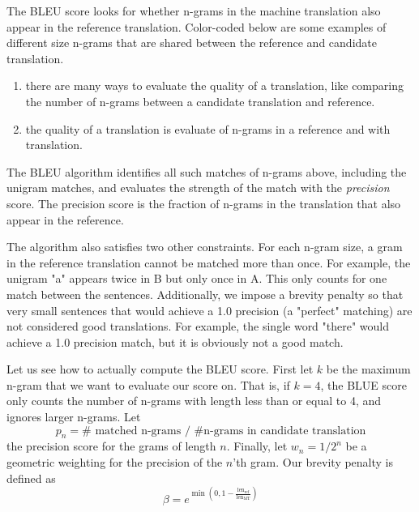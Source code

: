 \documentclass{tufte-handout}
\begin{document}
The BLEU score looks for whether n-grams in the machine translation also appear in the reference translation. Color-coded below are some examples of different size n-grams that are shared between the reference and candidate translation.

\begin{enumerate}[A]
\item there are many ways to evaluate \color{blue} the quality of a translation\color{black}, like comparing the number \color{red} of n-grams \color{black} between a candidate translation and \color{green} reference\color{black}. 

\item \color{blue} the quality of a translation \color{black} is evaluate \color{red} of n-grams \color{black} in a \color{green} reference \color{black} and with translation. 
\end{enumerate}

The BLEU algorithm identifies all such matches of n-grams above, including the unigram matches, and evaluates the strength of the match with the \textit{precision} score. The precision score is the fraction of n-grams in the translation that also appear in the reference. 

The algorithm also satisfies two other constraints. For each n-gram size, a gram in the reference translation cannot be matched more than once. For example, the unigram "a" appears twice in B but only once in A. This only counts for one match between the sentences. Additionally, we impose a brevity penalty so that very small sentences that would achieve a 1.0 precision (a "perfect" matching) are not considered good translations. For example, the single word "there" would achieve a 1.0 precision match, but it is obviously not a good match.

Let us see how to actually compute the BLEU score. First let $k$ be the maximum n-gram that we want to evaluate our score on. That is, if $k=4$, the BLUE score only counts the number of n-grams with length less than or equal to 4, and ignores larger n-grams. Let 
\begin{equation*}
p_n =  \# \text{ matched n-grams / \# n-grams in candidate translation}
\end{equation*}
the precision score for the grams of length $n$. Finally, let $w_n = 1/2^n $ be a geometric weighting for the precision of the $n$'th gram. Our brevity penalty is defined as
\begin{equation*}
\beta = e^{\min(0, 1 - \frac{\text{len}_\text{ref}}{\text{len}_\text{MT}})}
\end{equation*}
\end{document}
